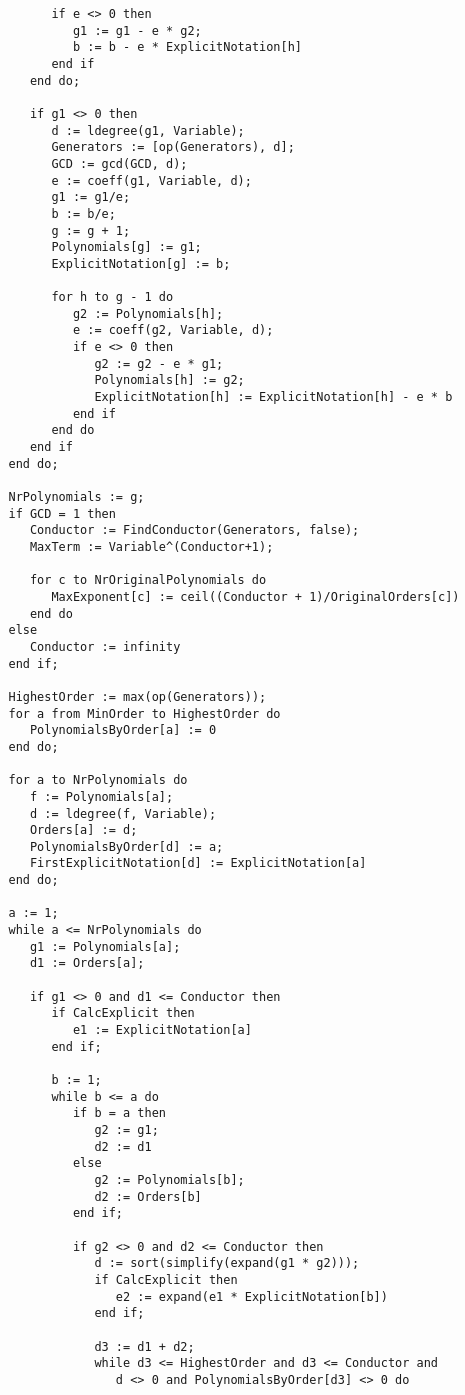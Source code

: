 \begin{verbatim}
         if e <> 0 then
            g1 := g1 - e * g2;
            b := b - e * ExplicitNotation[h]
         end if
      end do;

      if g1 <> 0 then
         d := ldegree(g1, Variable);
         Generators := [op(Generators), d];
         GCD := gcd(GCD, d);
         e := coeff(g1, Variable, d);
         g1 := g1/e;
         b := b/e;
         g := g + 1;
         Polynomials[g] := g1;
         ExplicitNotation[g] := b;

         for h to g - 1 do
            g2 := Polynomials[h];
            e := coeff(g2, Variable, d);
            if e <> 0 then
               g2 := g2 - e * g1;
               Polynomials[h] := g2;
               ExplicitNotation[h] := ExplicitNotation[h] - e * b
            end if
         end do
      end if
   end do;

   NrPolynomials := g;
   if GCD = 1 then
      Conductor := FindConductor(Generators, false);
      MaxTerm := Variable^(Conductor+1);

      for c to NrOriginalPolynomials do
         MaxExponent[c] := ceil((Conductor + 1)/OriginalOrders[c])
      end do
   else
      Conductor := infinity
   end if;

   HighestOrder := max(op(Generators));
   for a from MinOrder to HighestOrder do
      PolynomialsByOrder[a] := 0
   end do;

   for a to NrPolynomials do
      f := Polynomials[a];
      d := ldegree(f, Variable);
      Orders[a] := d;
      PolynomialsByOrder[d] := a;
      FirstExplicitNotation[d] := ExplicitNotation[a]
   end do;

   a := 1;
   while a <= NrPolynomials do
      g1 := Polynomials[a];
      d1 := Orders[a];

      if g1 <> 0 and d1 <= Conductor then
         if CalcExplicit then
            e1 := ExplicitNotation[a]
         end if;

         b := 1;
         while b <= a do
            if b = a then
               g2 := g1;
               d2 := d1
            else
               g2 := Polynomials[b];
               d2 := Orders[b]
            end if;

            if g2 <> 0 and d2 <= Conductor then
               d := sort(simplify(expand(g1 * g2)));
               if CalcExplicit then
                  e2 := expand(e1 * ExplicitNotation[b])
               end if;

               d3 := d1 + d2;
               while d3 <= HighestOrder and d3 <= Conductor and 
                  d <> 0 and PolynomialsByOrder[d3] <> 0 do
                  

\end{verbatim}
